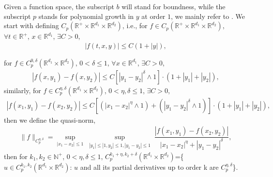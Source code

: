 \documentclass[11pt,reqno]{amsart}
\numberwithin{equation}{section}
\newcommand{\R}{\mathbb{R}}
\newcommand{\ga}{\gamma}
\newcommand{\de}{\delta}
\newcommand{\mb}{\mathbb}
\begin{document}
Given a
function space, the subscript $b$ will stand for boundness, while the subscript $p$ stands for polynomial growth in $y$ at order $1$, we mainly refer to  \cite[page.1209]{RX}.
We start with defining  $C_p(\mb{R}^{+}\times\mathbb{R}^{d_{1}}\times\mathbb{R}^{d_{2}})$, i.e., for $f\in C_p(\mb{R}^{+}\times\mathbb{R}^{d_{1}}\times\mathbb{R}^{d_{2}})$, $\forall t\in \R^{+}$, $ x\in \R^{d_{1}}$,  $\exists C>0$, 
\begin{align*}
|f(t,x,y)|\leq C (1+|y|),
\end{align*}

for $f\in C^{0,\de}_p(\mathbb{R}^{d_{1}}\times\mathbb{R}^{d_{2}})$, $0<\delta\leq1$, $\forall x\in \R^{d_{1}}$,  $\exists C>0$, 
\begin{align*}
|f(x,y_{1})-f(x,y_{2})|\leq C [|y_{1}-y_{2}|^{\de}\wedge1]\cdot(1+|y_1|+|y_2|),
\end{align*}
similarly, for  $f\in C^{\eta,\delta}_p(\mathbb{R}^{d_{1}}\times\mathbb{R}^{d_{2}})$, $0< \eta, \delta\leq1$,  $\exists C>0$,
\begin{align}\label{cp}
	|f(x_{1},y_{1})-f(x_{2},y_{2})|\leq C [(|x_{1}-x_{2}|^{\eta}\wedge1)+(|y_{1}-y_{2}|^{\delta}\wedge1)]\cdot(1+|y_{1}|+|y_{2}|),
\end{align}
then we define the quasi-norm, 
\begin{align*}
	\|f\|_{C^{\eta,\delta}_p}=\sup_{|x_{1}-x_{2}|\leq1}\sup_{\substack{|y_1|\leq|1,y_2|\leq1, |y_{1}-y_{2}|\leq1}}\dfrac{	|f(x_{1},y_{1})-f(x_{2},y_{2})|}{|x_{1}-x_{2}|^\eta+|y_{1}-y_{2}|^\delta},
\end{align*}
then for $k_1,k_2\in \mathbb{N}^+$, $0<\eta,\delta\leq1$, $C^{k_1+\eta,k_2+\delta}_p(\mathbb{R}^{d_{1}}\times\mathbb{R}^{d_{2}})$=\{$u\in  C^{k_1,k_2}_{p}(\mathbb{R}^{d_{1}}\times\mathbb{R}^{d_{2}})$: $u$ and all its  partial derivatives up to order k are $C^{\eta,\delta}_p$\}. 
\end{document}

